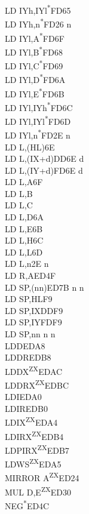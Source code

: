 \documentclass[twoside,openright,a4paper]{book}
\begin{document}
\begin{multicols}{3}
{\begin{tabbing}
	LD IYh,IYl\textsuperscript{*}\>FD65\\
	LD IYh,n\textsuperscript{*}\>FD26 n\\
	LD IYl,A\textsuperscript{*}\>FD6F\\
	LD IYl,B\textsuperscript{*}\>FD68\\
	LD IYl,C\textsuperscript{*}\>FD69\\
	LD IYl,D\textsuperscript{*}\>FD6A\\
	LD IYl,E\textsuperscript{*}\>FD6B\\
	LD IYl,IYh\textsuperscript{*}\>FD6C\\
	LD IYl,IYl\textsuperscript{*}\>FD6D\\
	LD IYl,n\textsuperscript{*}\>FD2E n\\
	LD L,(HL)\>6E\\
	LD L,(IX+d)\>DD6E d\\
	LD L,(IY+d)\>FD6E d\\
	LD L,A\>6F\\
	LD L,B\\
	LD L,C\\
	LD L,D\>6A\\
	LD L,E\>6B\\
	LD L,H\>6C\\
	LD L,L\>6D\\
	LD L,n\>2E n\\
	LD R,A\>ED4F\\
	LD SP,(nn)\>ED7B n n\\
	LD SP,HL\>F9\\
	LD SP,IX\>DDF9\\
	LD SP,IY\>FDF9\\
	LD SP,nn n n\\
	LDD\>EDA8\\
	LDDR\>EDB8\\
	LDDX\textsuperscript{ZX}\>EDAC\\
	LDDRX\textsuperscript{ZX}\>EDBC\\
	LDI\>EDA0\\
	LDIR\>EDB0\\
	LDIX\textsuperscript{ZX}\>EDA4\\
	LDIRX\textsuperscript{ZX}\>EDB4\\
	LDPIRX\textsuperscript{ZX}\>EDB7\\
	LDWS\textsuperscript{ZX}\>EDA5\\
	MIRROR A\textsuperscript{ZX}\>ED24\\
	MUL D,E\textsuperscript{ZX}\>ED30\\
	NEG\textsuperscript{*}\>ED4C\\

\end{tabbing}}
\end{multicols}
\end{document}

